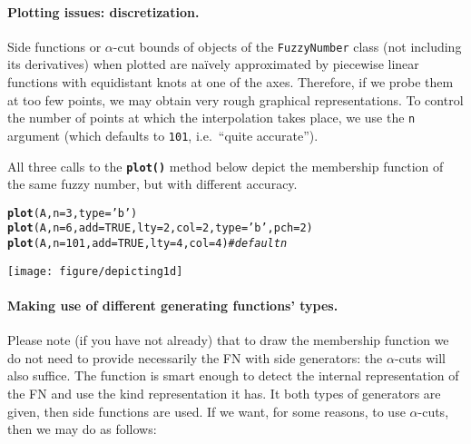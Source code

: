 \documentclass[11pt]{article}\usepackage[]{graphicx}\usepackage[]{color}
\makeatletter
\newcommand{\hlnum}[1]{\textcolor[rgb]{0.686,0.059,0.569}{#1}}%
\newcommand{\hlstr}[1]{\textcolor[rgb]{0.192,0.494,0.8}{#1}}%
\newcommand{\hlcom}[1]{\textcolor[rgb]{0.678,0.584,0.686}{\textit{#1}}}%
\newcommand{\hlstd}[1]{\textcolor[rgb]{0.345,0.345,0.345}{#1}}%
\newcommand{\hlkwc}[1]{\textcolor[rgb]{0.333,0.667,0.333}{#1}}%
\newcommand{\hlkwd}[1]{\textcolor[rgb]{0.737,0.353,0.396}{\textbf{#1}}}%
\newenvironment{kframe}{%
 \def\at@end@of@kframe{}%
 \ifinner\ifhmode%
  \def\at@end@of@kframe{\end{minipage}}%
  \begin{minipage}{\columnwidth}%
 \fi\fi%
 \def\FrameCommand##1{\hskip\@totalleftmargin \hskip-\fboxsep
 \colorbox{shadecolor}{##1}\hskip-\fboxsep
     \hskip-\linewidth \hskip-\@totalleftmargin \hskip\columnwidth}%
 \MakeFramed {\advance\hsize-\width
   \@totalleftmargin\z@ \linewidth\hsize
   \@setminipage}}%
 {\par\unskip\endMakeFramed%
 \at@end@of@kframe}
\newenvironment{knitrout}{}{} %
\newcommand{\func}[1]{\texttt{\hlkwd{#1}}}
\newcommand{\argument}[1]{\texttt{\hlkwc{#1}}}
\makeatother
\begin{document}
\paragraph{Plotting issues: discretization.}
Side functions or $\alpha$-cut bounds of objects of the \texttt{FuzzyNumber}
class (not including its derivatives) when plotted are na\"{i}vely
approximated by piecewise linear functions with equidistant knots
at one of the axes. Therefore, if we probe them
at too few points, we may obtain very rough graphical representations.
To control the number of points at which the interpolation takes place,
we use the \argument{n} argument (which defaults to \texttt{101}, i.e.~``quite
accurate'').

All three calls to the \func{plot()} method below depict the membership
function of the same fuzzy number, but with different accuracy.

\begin{knitrout}\small
{}\color{fgcolor}\begin{kframe}
\begin{alltt}
\hlkwd{plot}\hlstd{(A,} \hlkwc{n}\hlstd{=}\hlnum{3}\hlstd{,} \hlkwc{type}\hlstd{=}\hlstr{'b'}\hlstd{)}
\hlkwd{plot}\hlstd{(A,} \hlkwc{n}\hlstd{=}\hlnum{6}\hlstd{,} \hlkwc{add}\hlstd{=}\hlnum{TRUE}\hlstd{,}  \hlkwc{lty}\hlstd{=}\hlnum{2}\hlstd{,} \hlkwc{col}\hlstd{=}\hlnum{2}\hlstd{,} \hlkwc{type}\hlstd{=}\hlstr{'b'}\hlstd{,} \hlkwc{pch}\hlstd{=}\hlnum{2}\hlstd{)}
\hlkwd{plot}\hlstd{(A,} \hlkwc{n}\hlstd{=}\hlnum{101}\hlstd{,} \hlkwc{add}\hlstd{=}\hlnum{TRUE}\hlstd{,} \hlkwc{lty}\hlstd{=}\hlnum{4}\hlstd{,} \hlkwc{col}\hlstd{=}\hlnum{4}\hlstd{)} \hlcom{# default n}
\end{alltt}
\end{kframe}
\end{knitrout}

\begin{center}
\begin{knitrout}\small
{}\color{fgcolor}

{\centering \texttt{[image: figure/depicting1d]} 

}



\end{knitrout}
\end{center}




\paragraph{Making use of different generating functions' types.}
Please note (if you have not already) that to draw the membership
function we do not need to provide necessarily the FN with side generators:
the $\alpha$-cuts will also suffice.
The function is smart enough to detect the internal
representation of the FN and use the kind representation it has.
It both types of generators are given, then side functions are used.
If we want, for some reasons, to use $\alpha$-cuts, then we may do as follows:
\end{document}
